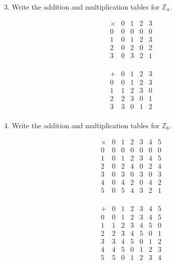 \documentclass{article}
\begin{document}
\begin{exercise}{}{}
	{3. Write the addition and multiplication tables for $\mathbb{Z}_4$.}
	\begin{alist}
		\item \[
			\begin{array}{c|cccc}
				\times & 0 & 1 & 2 & 3 \\
				\hline
				0      & 0 & 0 & 0 & 0 \\
				1      & 0 & 1 & 2 & 3 \\
				2      & 0 & 2 & 0 & 2 \\
				3      & 0 & 3 & 2 & 1 \\
			\end{array} \]
		\item \[
			\begin{array}{c|cccc}
				+ & 0 & 1 & 2 & 3 \\
				\hline
				0 & 0 & 1 & 2 & 3 \\
				1 & 1 & 2 & 3 & 0 \\
				2 & 2 & 3 & 0 & 1 \\
				3 & 3 & 0 & 1 & 2 \\
			\end{array} \]
	\end{alist}
\end{exercise}{}{}

\begin{exercise}{}{}
	{4. Write the addition and multiplication tables for $\mathbb{Z}_6$.}
	\begin{alist}
		\item \[
			\begin{array}{c|cccccc}
				\times & 0 & 1 & 2 & 3 & 4 & 5 \\
				\hline
				0      & 0 & 0 & 0 & 0 & 0 & 0 \\
				1      & 0 & 1 & 2 & 3 & 4 & 5 \\
				2      & 0 & 2 & 4 & 0 & 2 & 4 \\
				3      & 0 & 3 & 0 & 3 & 0 & 3 \\
				4      & 0 & 4 & 2 & 0 & 4 & 2 \\
				5      & 0 & 5 & 4 & 3 & 2 & 1 \\
			\end{array}
		\]
		\item \[
			\begin{array}{c|cccccc}
				+ & 0 & 1 & 2 & 3 & 4 & 5 \\
				\hline
				0 & 0 & 1 & 2 & 3 & 4 & 5 \\
				1 & 1 & 2 & 3 & 4 & 5 & 0 \\
				2 & 2 & 3 & 4 & 5 & 0 & 1 \\
				3 & 3 & 4 & 5 & 0 & 1 & 2 \\
				4 & 4 & 5 & 0 & 1 & 2 & 3 \\
				5 & 5 & 0 & 1 & 2 & 3 & 4 \\
			\end{array}
		\]
	\end{alist}
\end{exercise}{}{}
\end{document}
